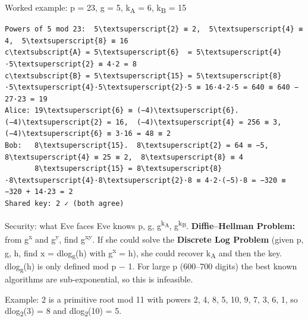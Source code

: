 \documentclass[11pt,a4paper]{article}
\begin{document}
\begin{example}{Worked example: p = 23, g = 5, k\textsubscript{A} = 6, k\textsubscript{B} = 15}
\begin{workbox}
\begin{Verbatim}[commandchars=\\\{\},fontsize=\footnotesize]
Powers of 5 mod 23:  5\textsuperscript{2} ≡ 2,  5\textsuperscript{4} ≡ 4,  5\textsuperscript{8} ≡ 16
c\textsubscript{A} = 5\textsuperscript{6}  = 5\textsuperscript{4}·5\textsuperscript{2} ≡ 4·2 = 8
c\textsubscript{B} = 5\textsuperscript{15} = 5\textsuperscript{8}·5\textsuperscript{4}·5\textsuperscript{2}·5 ≡ 16·4·2·5 = 640 ≡ 640 − 27·23 = 19
Alice: 19\textsuperscript{6} ≡ (−4)\textsuperscript{6}.  (−4)\textsuperscript{2} = 16,  (−4)\textsuperscript{4} = 256 ≡ 3,  (−4)\textsuperscript{6} ≡ 3·16 = 48 ≡ 2
Bob:   8\textsuperscript{15}.  8\textsuperscript{2} = 64 ≡ −5,  8\textsuperscript{4} ≡ 25 ≡ 2,  8\textsuperscript{8} ≡ 4
       8\textsuperscript{15} = 8\textsuperscript{8}·8\textsuperscript{4}·8\textsuperscript{2}·8 ≡ 4·2·(−5)·8 = −320 ≡ −320 + 14·23 = 2
Shared key: 2 ✓ (both agree)
\end{Verbatim}
\end{workbox}
\end{example}
\begin{concept}{Security: what Eve faces}
Eve knows p, g, g\textsuperscript{k\textsubscript{A}}, g\textsuperscript{k\textsubscript{B}}. \textbf{Diffie–Hellman Problem:} from g\textsuperscript{x} and g\textsuperscript{y}, find g\textsuperscript{xy}. If she could solve the \textbf{Discrete Log Problem} (given p, g, h, find x = dlog\textsubscript{g}(h) with g\textsuperscript{x} = h), she could recover k\textsubscript{A} and then the key. dlog\textsubscript{g}(h) is only defined mod p \ensuremath{-} 1. For large p (600–700 digits) the best known algorithms are sub-exponential, so this is infeasible.\par
Example: 2 is a primitive root mod 11 with powers 2, 4, 8, 5, 10, 9, 7, 3, 6, 1, so dlog\textsubscript{2}(3) = 8 and dlog\textsubscript{2}(10) = 5.\par
\end{concept}
\end{document}
